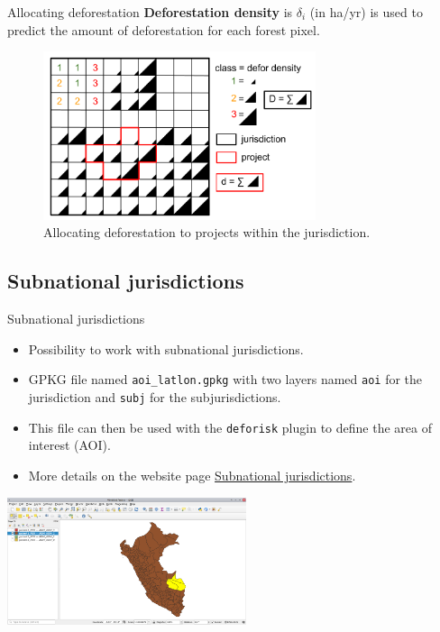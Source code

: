\documentclass[10pt,table,dvipsnames,compress]{beamer}
\begin{document}
\begin{frame}[label={sec:orge68269d}]{Allocating deforestation}
\textbf{Deforestation density} is \(\delta_{i}\) (in ha/yr) is used to predict the amount of deforestation for each forest pixel.

\begin{figure}[htbp]
\centering
\includegraphics[width=8cm]{figs/get_started/allocation.png}
\caption{Allocating deforestation to projects within the jurisdiction.}
\end{figure}
\end{frame}

\subsection{Subnational jurisdictions}
\label{sec:orgada2c1e}

\begin{frame}[label={sec:org6424960},fragile]{Subnational jurisdictions}
 \begin{itemize}
\item Possibility to work with subnational jurisdictions.
\item GPKG file named \texttt{aoi\_latlon.gpkg} with two layers named \texttt{aoi} for the jurisdiction and \texttt{subj} for the subjurisdictions.
\item This file can then be used with the \texttt{deforisk} plugin to define the area of interest (AOI).
\item More details on the website page \href{https://deforisk-qgis-plugin.org/articles/subnational\_jurisd.html}{Subnational jurisdictions}.
\end{itemize}

\begin{center}
\includegraphics[width=7cm]{figs/select_subjurisdictions.png}
\end{center}
\end{frame}
\end{document}
